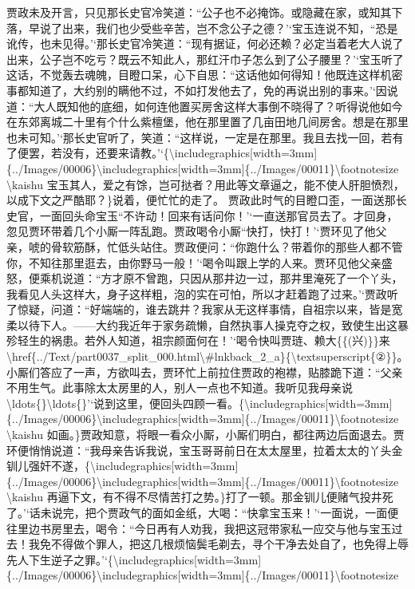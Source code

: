 贾政未及开言，只见那长史官冷笑道：``公子也不必掩饰。或隐藏在家，或知其下落，早说了出来，我们也少受些辛苦，岂不念公子之德？'`宝玉连说不知，``恐是讹传，也未见得。'`那长史官冷笑道：``现有据证，何必还赖？必定当着老大人说了出来，公子岂不吃亏？既云不知此人，那红汗巾子怎么到了公子腰里？'`宝玉听了这话，不觉轰去魂魄，目瞪口呆，心下自思：``这话他如何得知！他既连这样机密事都知道了，大约别的瞒他不过，不如打发他去了，免的再说出别的事来。'`因说道：``大人既知他的底细，如何连他置买房舍这样大事倒不晓得了？听得说他如今在东郊离城二十里有个什么紫檀堡，他在那里置了几亩田地几间房舍。想是在那里也未可知。'`那长史官听了，笑道：``这样说，一定是在那里。我且去找一回，若有了便罢，若没有，还要来请教。'`\{\textbackslash{}includegraphics{[}width=3mm{]}\{../Images/00006\}\textbackslash{}includegraphics{[}width=3mm{]}\{../Images/00011\}\textbackslash{}footnotesize
\textbackslash{}kaishu
宝玉其人，爱之有馀，岂可挞者？用此等文章逼之，能不使人肝胆愤烈，以成下文之严酷耶？\}说着，便忙忙的走了。
贾政此时气的目瞪口歪，一面送那长史官，一面回头命宝玉``不许动！回来有话问你！'`一直送那官员去了。才回身，忽见贾环带着几个小厮一阵乱跑。贾政喝令小厮``快打，快打！'`贾环见了他父亲，唬的骨软筋酥，忙低头站住。贾政便问：``你跑什么？带着你的那些人都不管你，不知往那里逛去，由你野马一般！'`喝令叫跟上学的人来。贾环见他父亲盛怒，便乘机说道：``方才原不曾跑，只因从那井边一过，那井里淹死了一个丫头，我看见人头这样大，身子这样粗，泡的实在可怕，所以才赶着跑了过来。'`贾政听了惊疑，问道：``好端端的，谁去跳井？我家从无这样事情，自祖宗以来，皆是宽柔以待下人。------大约我近年于家务疏懒，自然执事人操克夺之权，致使生出这暴殄轻生的祸患。若外人知道，祖宗颜面何在！'`喝令快叫贾琏、赖大\{\{(兴)\}\}来\textbackslash{}href\{../Text/part0037\_split\_000.html\textbackslash{}\#lnkback\_2\_a\}\{\textbackslash{}textsuperscript\{②\}\}。
小厮们答应了一声，方欲叫去，贾环忙上前拉住贾政的袍襟，贴膝跪下道：``父亲不用生气。此事除太太房里的人，别人一点也不知道。我听见我母亲说\textbackslash{}ldots\{\}\textbackslash{}ldots\{\}'`说到这里，便回头四顾一看。\{\textbackslash{}includegraphics{[}width=3mm{]}\{../Images/00006\}\textbackslash{}includegraphics{[}width=3mm{]}\{../Images/00011\}\textbackslash{}footnotesize
\textbackslash{}kaishu
如画。\}贾政知意，将眼一看众小厮，小厮们明白，都往两边后面退去。贾环便悄悄说道：``我母亲告诉我说，宝玉哥哥前日在太太屋里，拉着太太的丫头金钏儿强奸不遂，\{\textbackslash{}includegraphics{[}width=3mm{]}\{../Images/00006\}\textbackslash{}includegraphics{[}width=3mm{]}\{../Images/00011\}\textbackslash{}footnotesize
\textbackslash{}kaishu
再逼下文，有不得不尽情苦打之势。\}打了一顿。那金钏儿便赌气投井死了。'`话未说完，把个贾政气的面如金纸，大喝：``快拿宝玉来！'`一面说，一面便往里边书房里去，喝令：``今日再有人劝我，我把这冠带家私一应交与他与宝玉过去！我免不得做个罪人，把这几根烦恼鬓毛剃去，寻个干净去处自了，也免得上辱先人下生逆子之罪。'`\{\textbackslash{}includegraphics{[}width=3mm{]}\{../Images/00006\}\textbackslash{}includegraphics{[}width=3mm{]}\{../Images/00011\}\textbackslash{}footnotesize
